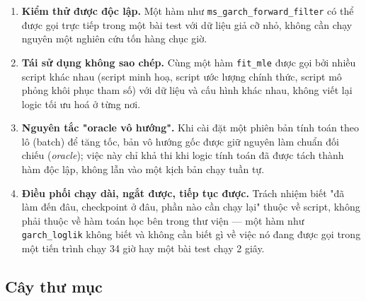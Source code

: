 \documentclass[11pt,a4paper]{article}
\newcommand{\code}[1]{\texttt{#1}}
\begin{document}
\begin{enumerate}
  \item \textbf{Kiểm thử được độc lập.} Một hàm như \code{ms\_garch\_forward\_filter}
    có thể được gọi trực tiếp trong một bài test với dữ liệu giả cỡ nhỏ, không cần
    chạy nguyên một nghiên cứu tốn hàng chục giờ.
  \item \textbf{Tái sử dụng không sao chép.} Cùng một hàm \code{fit\_mle} được gọi
    bởi nhiều script khác nhau (script minh hoạ, script ước lượng chính thức, script
    mô phỏng khôi phục tham số) với dữ liệu và cấu hình khác nhau, không viết lại
    logic tối ưu hoá ở từng nơi.
  \item \textbf{Nguyên tắc "oracle vô hướng".} Khi cài đặt một phiên bản tính toán
    theo lô (batch) để tăng tốc, bản vô hướng gốc được giữ nguyên làm chuẩn đối
    chiếu (\emph{oracle}); việc này chỉ khả thi khi logic tính toán đã được tách
    thành hàm độc lập, không lẫn vào một kịch bản chạy tuần tự.
  \item \textbf{Điều phối chạy dài, ngắt được, tiếp tục được.} Trách nhiệm biết
    "đã làm đến đâu, checkpoint ở đâu, phần nào cần chạy lại" thuộc về script, không
    phải thuộc về hàm toán học bên trong thư viện --- một hàm như
    \code{garch\_loglik} không biết và không cần biết gì về việc nó đang được gọi
    trong một tiến trình chạy 34 giờ hay một bài test chạy 2 giây.
\end{enumerate}

\subsection{Cây thư mục}
\end{document}
